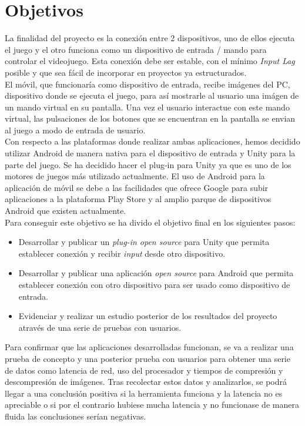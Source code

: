 \section{Objetivos}

La finalidad del proyecto es la conexi\'on entre 2 dispositivos, uno de ellos ejecuta el juego y el otro funciona como un dispositivo de entrada / mando para controlar el videojuego. Esta conexi\'on debe ser estable, con el m\'inimo \textit{Input Lag} posible y que sea f\'acil de incorporar en proyectos ya estructurados.\\

El m\'ovil, que funcionar\'ia como dispositivo de entrada, recibe im\'agenes del PC, dispositivo donde se ejecuta el juego, para as\'i mostrarle al usuario una im\'agen de un mando virtual en su pantalla. Una vez el usuario interactue con este mando virtual, las pulsaciones de los botones que se encuentran en la pantalla se envian al juego a modo de entrada de usuario.\\

Con respecto a las plataformas donde realizar ambas aplicaciones, hemos decidido utilizar Android de manera nativa para el dispositivo de entrada y Unity para la parte del juego. Se ha decidido hacer el plug-in para Unity ya que es uno de los motores de juegos m\'as utilizado actualmente. El uso de Android para la aplicaci\'on de m\'ovil se debe a las facilidades que ofrece Google para subir aplicaciones a la plataforma Play Store y al amplio parque de dispositivos Android que existen actualmente.\\

Para conseguir este objetivo se ha divido el objetivo final en los siguientes pasos:

\begin {itemize}
\item Desarrollar y publicar un \textit{plug-in open source} para Unity que permita establecer conexi\'on y recibir \textit{input} desde otro dispositivo.
\item Desarrollar y publicar una aplicaci\'on \textit{open source} para Android que permita establecer conexi\'on con otro dispositivo para ser usado como dispositivo de entrada.
\item Evidenciar y realizar un estudio posterior de los resultados del proyecto atrav\'es de una serie de pruebas con usuarios. 
\end {itemize}

Para confirmar que las aplicaciones desarrolladas funcionan, se va a realizar una prueba de concepto y una posterior prueba con usuarios para obtener una serie de datos como latencia de red, uso del procesador y tiempos de compresi\'on y descompresi\'on de im\'agenes. Tras recolectar estos datos y analizarlos, se podr\'a llegar a una conclusi\'on positiva si la herramienta funciona y la latencia no es apreciable o si por el contrario hubiese mucha latencia y no funcionase de manera fluida las conclusiones ser\'ian negativas.

